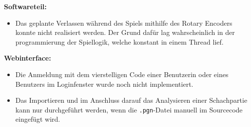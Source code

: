 \textbf{Softwareteil:}
\begin{itemize}
    \item Das geplante Verlassen während des Spiels mithilfe des Rotary Encoders konnte nicht realisiert werden. Der Grund dafür lag wahrscheinlich in der programmierung der Spiellogik, welche konstant in einem Thread lief.
\end{itemize}

\textbf{Webinterface:}
\begin{itemize}
    \item Die Anmeldung mit dem vierstelligen Code einer Benutzerin oder eines Benutzers im Loginfenster wurde noch nicht implementiert.
    \item Das Importieren und im Anschluss darauf das Analysieren einer Schachpartie kann nur durchgeführt werden, wenn die \verb|.pgn|-Datei manuell im Sourcecode eingefügt wird.
\end{itemize}

